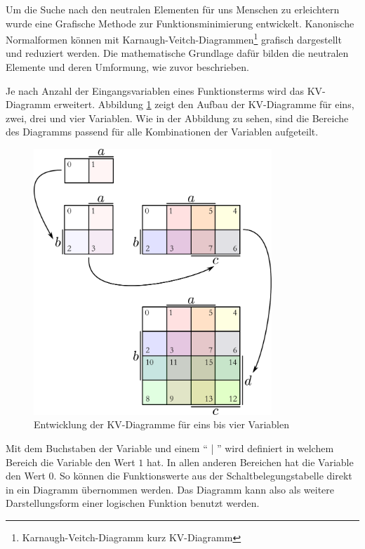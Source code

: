 \documentclass[11pt,a4paper]{scrreprt}
\begin{document}
Um die Suche nach den neutralen Elementen für uns Menschen zu erleichtern wurde eine Grafische Methode zur Funktionsminimierung entwickelt. Kanonische Normalformen können mit Karnaugh-Veitch-Diagrammen\footnote{Karnaugh-Veitch-Diagramm kurz KV-Diagramm} grafisch dargestellt und reduziert werden. Die mathematische Grundlage dafür bilden die neutralen Elemente und deren Umformung, wie zuvor beschrieben.


Je nach Anzahl der Eingangsvariablen eines Funktionsterms wird das KV-Diagramm erweitert. Abbildung \ref{KVdiag_Entw} zeigt den Aufbau der KV-Diagramme für eins, zwei, drei und vier Variablen. Wie in der Abbildung zu sehen, sind die Bereiche des Diagramms passend für alle Kombinationen der Variablen aufgeteilt.

\begin{figure}[htbp] %
	\centering
	\includegraphics[width=0.8\textwidth]{KVdiagramm_Entwicklung.pdf}
	\caption{Entwicklung der KV-Diagramme für eins bis vier Variablen}
	\label{KVdiag_Entw}
\end{figure}

Mit dem Buchstaben der Variable und einem "` | "' wird definiert in welchem Bereich die Variable den Wert $1$ hat. In allen anderen Bereichen hat die Variable den Wert $0$. So können die Funktionswerte aus der Schaltbelegungstabelle direkt in ein Diagramm übernommen werden. Das Diagramm kann also als weitere Darstellungsform einer logischen Funktion benutzt werden.
\end{document}
